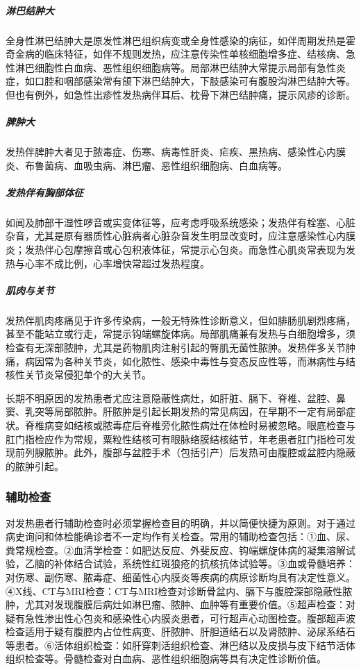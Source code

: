 \subparagraph{淋巴结肿大}

全身性淋巴结肿大是原发性淋巴组织病变或全身性感染的病征，如伴周期发热是霍奇金病的临床特征，如伴不规则发热，应注意传染性单核细胞增多症、结核病、急性淋巴细胞性白血病、恶性组织细胞病等。局部淋巴结肿大常提示局部有急性炎症，如口腔和咽部感染常有颌下淋巴结肿大，下肢感染可有腹股沟淋巴结肿大等。但也有例外，如急性出疹性发热病伴耳后、枕骨下淋巴结肿痛，提示风疹的诊断。

\subparagraph{脾肿大}

发热伴脾肿大者见于脓毒症、伤寒、病毒性肝炎、疟疾、黑热病、感染性心内膜炎、布鲁菌病、血吸虫病、淋巴瘤、恶性组织细胞病、白血病等。

\subparagraph{发热伴有胸部体征}

如闻及肺部干湿性啰音或实变体征等，应考虑呼吸系统感染；发热伴有栓塞、心脏杂音，尤其是原有器质性心脏病者心脏杂音发生明显改变时，应注意感染性心内膜炎；发热伴心包摩擦音或心包积液体征，常提示心包炎。而急性心肌炎常表现为发热与心率不成比例，心率增快常超过发热程度。

\subparagraph{肌肉与关节}

发热伴肌肉疼痛见于许多传染病，一般无特殊性诊断意义，但如腓肠肌剧烈疼痛，甚至不能站立或行走，常提示钩端螺旋体病。局部肌痛兼有发热与白细胞增多，须检查有无深部脓肿，尤其是药物肌肉注射引起的臀肌无菌性脓肿。发热伴多关节肿痛，病因常为各种关节炎，如化脓性、感染中毒性与变态反应性等，而淋病性与结核性关节炎常侵犯单个的大关节。

长期不明原因的发热患者尤应注意隐蔽性病灶，如肝脏、膈下、脊椎、盆腔、鼻窦、乳突等局部脓肿。肝脓肿是引起长期发热的常见病因，在早期不一定有局部症状。脊椎病变如结核或脓毒症后脊椎旁化脓性病灶在体检时易被忽略。眼底检查与肛门指检应作为常规，粟粒性结核可有眼脉络膜结核结节，年老患者肛门指检可发现前列腺脓肿。此外，腹部与盆腔手术（包括引产）后发热可由腹腔或盆腔内隐蔽的脓肿引起。

\subsubsection{辅助检查}

对发热患者行辅助检查时必须掌握检查目的明确，并以简便快捷为原则。对于通过病史询问和体检能确诊者不一定均作有关检查。常用的辅助检查包括：①血、尿、粪常规检查。②血清学检查：如肥达反应、外斐反应、钩端螺旋体病的凝集溶解试验，乙脑的补体结合试验，系统性红斑狼疮的抗核抗体试验等。③血或骨髓培养：对伤寒、副伤寒、脓毒症、细菌性心内膜炎等疾病的病原诊断均具有决定性意义。④X线、CT与MRI检查：CT与MRI检查对诊断骨盆内、膈下与腹腔深部隐蔽性脓肿，尤其对发现腹膜后病灶如淋巴瘤、脓肿、血肿等有重要价值。⑤超声检查：对疑有急性渗出性心包炎和感染性心内膜炎患者，可行超声心动图检查。腹部超声波检查适用于疑有腹腔内占位性病变、肝脓肿、肝胆道结石以及肾脓肿、泌尿系结石等患者。⑥活体组织检查：如肝穿刺活组织检查、淋巴结以及皮损与皮下结节活体组织检查等。骨髓检查对白血病、恶性组织细胞病等具有决定性诊断价值。

